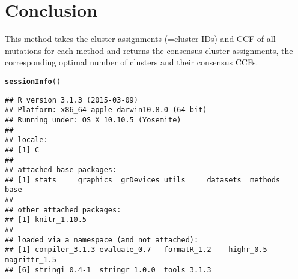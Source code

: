 \documentclass{article}\usepackage[]{graphicx}\usepackage[]{color}
\makeatletter
\newcommand{\hlstd}[1]{\textcolor[rgb]{0.345,0.345,0.345}{#1}}%
\newcommand{\hlkwd}[1]{\textcolor[rgb]{0.737,0.353,0.396}{\textbf{#1}}}%
\newenvironment{kframe}{%
 \def\at@end@of@kframe{}%
 \ifinner\ifhmode%
  \def\at@end@of@kframe{\end{minipage}}%
  \begin{minipage}{\columnwidth}%
 \fi\fi%
 \def\FrameCommand##1{\hskip\@totalleftmargin \hskip-\fboxsep
 \colorbox{shadecolor}{##1}\hskip-\fboxsep
     \hskip-\linewidth \hskip-\@totalleftmargin \hskip\columnwidth}%
 \MakeFramed {\advance\hsize-\width
   \@totalleftmargin\z@ \linewidth\hsize
   \@setminipage}}%
 {\par\unskip\endMakeFramed%
 \at@end@of@kframe}
\newenvironment{knitrout}{}{} %
\makeatother
\begin{document}
\section*{Conclusion}
This method takes the cluster assignments (=cluster IDs) and CCF of
all mutations for each method and returns the consensus cluster
assignments, the corresponding optimal number of clusters and their
consensus CCFs.

\begin{knitrout}\scriptsize
{}\color{fgcolor}\begin{kframe}
\begin{alltt}
\hlkwd{sessionInfo}\hlstd{()}
\end{alltt}
\begin{verbatim}
## R version 3.1.3 (2015-03-09)
## Platform: x86_64-apple-darwin10.8.0 (64-bit)
## Running under: OS X 10.10.5 (Yosemite)
## 
## locale:
## [1] C
## 
## attached base packages:
## [1] stats     graphics  grDevices utils     datasets  methods   base     
## 
## other attached packages:
## [1] knitr_1.10.5
## 
## loaded via a namespace (and not attached):
## [1] compiler_3.1.3 evaluate_0.7   formatR_1.2    highr_0.5      magrittr_1.5  
## [6] stringi_0.4-1  stringr_1.0.0  tools_3.1.3
\end{verbatim}
\end{kframe}
\end{knitrout}




\end{document}
